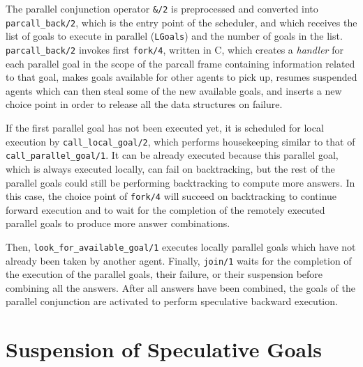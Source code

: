 \documentclass{tlp}
\newcounter{mnotei} \setcounter{mnotei}{0}
\newcommand{\mnote}[1]{{\scriptsize\textsf{\textcolor{blue}{}}}\marginpar{\scriptsize\textsf{\textcolor{red}{n.\themnotei: #1}}}\stepcounter{mnotei} }
\renewcommand{\mnote}[1]{}
\newcommand{\compressection}{\vspace{-1em}}
\begin{document}
The parallel conjunction operator \lstinline{&/2} is
preprocessed and converted into \lstinline{parcall_back/2}, which is
the entry point of the scheduler, and which receives the list of goals
to execute in parallel (\lstinline{LGoals}) and the number of goals in
the list.
\lstinline{parcall_back/2} invokes first \lstinline{fork/4}, written
in C, which creates a \emph{handler} for each parallel goal in the
scope of the parcall frame containing information related to that
goal, makes goals available for other agents to pick up, resumes
suspended agents which can then steal some of the new 
available goals, and inserts a new choice point in order to release all
the data structures on failure.

If the first parallel goal has not been executed yet, it is scheduled
for local execution\mnote{MCL: in many cases (e.g., usual recursion)
  it is much better to execute the last (or, in general, the recursive
  one) in order to spawn parallel goals as fast as possible.} by
\lstinline{call_local_goal/2}, which performs housekeeping similar to
that of \lstinline{call_parallel_goal/1}.  It can be already executed
because\mnote{MCL: I don't understand this?} this parallel goal, which
is always executed locally, can fail on backtracking, but the rest of
the parallel goals could still be performing backtracking to compute
more answers.  In this case, the choice point of \lstinline{fork/4}
will succeed on backtracking to continue forward execution and to wait
for the completion of the remotely executed parallel goals to produce
more answer combinations.


Then, \lstinline{look_for_available_goal/1} executes locally parallel
goals which have not already been taken by another agent.  Finally,
\lstinline{join/1} waits for the completion of the execution of the
parallel goals, their failure, or their suspension before combining
all the answers. After all answers have been combined, the goals of the
parallel conjunction are activated to perform speculative backward
execution.


\compressection
\section{Suspension of Speculative Goals}
\label{sec:goal-suspension}
\end{document}
